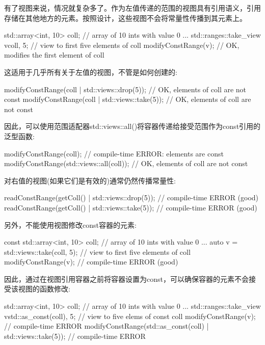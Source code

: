 有了视图来说，情况就复杂多了。作为左值传递的范围的视图具有引用语义，引用存储在其他地方的元素。按照设计，这些视图不会将常量性传播到其元素上。

\begin{cpp}
std::array<int, 10> coll{}; // array of 10 ints with value 0
...
std::ranges::take_view v{coll, 5}; // view to first five elements of coll
modifyConstRange(v); // OK, modifies the first element of coll
\end{cpp}

这适用于几乎所有关于左值的视图，不管是如何创建的:

\begin{cpp}
modifyConstRange(coll | std::views::drop(5)); // OK, elements of coll are not const
modifyConstRange(coll | std::views::take(5)); // OK, elements of coll are not const
\end{cpp}

因此，可以使用范围适配器std::views::all()将容器传递给接受范围作为const引用的泛型函数:

\begin{cpp}
modifyConstRange(coll); // compile-time ERROR: elements are const
modifyConstRange(std::views::all(coll)); // OK, elements of coll are not const
\end{cpp}

对右值的视图(如果它们是有效的)通常仍然传播常量性:

\begin{cpp}
readConstRange(getColl() | std::views::drop(5)); // compile-time ERROR (good)
readConstRange(getColl() | std::views::take(5)); // compile-time ERROR (good)
\end{cpp}

另外，不能使用视图修改const容器的元素:

\begin{cpp}
const std::array<int, 10> coll{}; // array of 10 ints with value 0
...
auto v = std::views::take(coll, 5); // view to first five elements of coll
modifyConstRange(v); // compile-time ERROR (good)
\end{cpp}

因此，通过在视图引用容器之前将容器设置为const，可以确保容器的元素不会接受该视图的函数修改:

\begin{cpp}
std::array<int, 10> coll{}; // array of 10 ints with value 0
...
std::ranges::take_view v{std::as_const(coll), 5}; // view to five elems of const coll
modifyConstRange(v); // compile-time ERROR
modifyConstRange(std::as_const(coll) | std::views::take(5)); // compile-time ERROR
\end{cpp}

